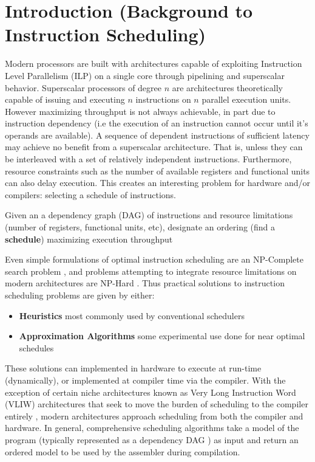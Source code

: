 \documentclass[12pt]{report}
\begin{document}
\newpage
\thispagestyle{empty}
\tableofcontents
\newpage

\chapter{Introduction (Background to Instruction Scheduling)}
\label{sec:orgede9f97}
Modern processors are built with architectures capable of exploiting
Instruction Level Parallelism (ILP) on a single core 
through pipelining and superscalar behavior. Superscalar
processors of degree \(n\) are architectures theoretically capable of issuing
and executing \(n\) instructions on \(n\) parallel execution units. However
maximizing throughput is not always achievable, in part due to instruction
dependency (i.e the execution of an instruction cannot occur until it's
operands are available). A sequence of dependent instructions of sufficient
latency may achieve no benefit from a superscalar architecture. That is, unless they can be
interleaved with a set of relatively independent instructions. Furthermore,
resource constraints such as the number of available registers and functional
units can also delay execution. This creates an interesting problem for
hardware and/or compilers: selecting a schedule of instructions.
\begin{tcolorbox}[title=Problem: Instruction Scheduling]
Given an a dependency graph (DAG) of instructions and resource limitations
(number of registers, functional units, etc), designate an ordering (find a \textbf{schedule}) 
maximizing execution throughput 
\end{tcolorbox}

Even simple formulations of optimal instruction scheduling are an NP-Complete
search problem \parencite{hennessy1983postpass}, and problems attempting to
integrate resource limitations on modern architectures are NP-Hard
\parencite{motwani1995combining}. Thus practical solutions to instruction
scheduling problems are given by either:
\begin{itemize}
\item \textbf{Heuristics} most commonly used by conventional schedulers
\item \textbf{Approximation Algorithms} some experimental use done for near optimal
schedules \parencite{costa2016approx}
\end{itemize}
These solutions can implemented in hardware to execute at run-time
 (dynamically), or implemented at compiler time via the compiler. With the
 exception of certain niche architectures known as Very Long Instruction Word
 (VLIW) architectures that seek to move the burden of scheduling to the compiler
 entirely \parencite{fisher1983very}, modern architectures approach scheduling
 from both the compiler and hardware. In general, comprehensive scheduling
 algorithms take a model of the program (typically represented as a dependency
 DAG \parencite{gibbons1986efficient}) as input and return an ordered model to
 be used by the assembler during compilation.
\end{document}

